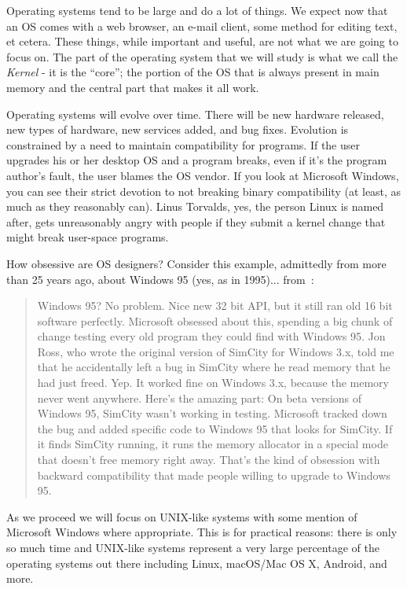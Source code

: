 Operating systems tend to be large and do a lot of things. We expect now that an OS comes with a web browser, an e-mail client, some method for editing text, et cetera. These things, while important and useful, are not what we are going to focus on. The part of the operating system that we will study is what we call the \textit{Kernel} - it is the ``core''; the portion of the OS that is always present in main memory and the central part that makes it all work.

Operating systems will evolve over time. There will be new hardware released, new types of hardware, new services added, and bug fixes. Evolution is constrained by a need to maintain compatibility for programs. If the user upgrades his or her desktop OS and a program breaks, even if it's the program author's fault, the user blames the OS vendor. If you look at Microsoft Windows, you can see their strict devotion to not breaking binary compatibility (at least, as much as they reasonably can). Linus Torvalds, yes, the person Linux is named after, gets unreasonably angry with people if they submit a kernel change that might break user-space programs. 

How obsessive are OS designers? Consider this example, admittedly from more than 25 years ago, about Windows 95 (yes, as in 1995)... from~\cite{joelce}:

\begin{quote}
Windows 95? No problem. Nice new 32 bit API, but it still ran old 16 bit software perfectly. Microsoft obsessed about this, spending a big chunk of change testing every old program they could find with Windows 95. Jon Ross, who wrote the original version of SimCity for Windows 3.x, told me that he accidentally left a bug in SimCity where he read memory that he had just freed. Yep. It worked fine on Windows 3.x, because the memory never went anywhere. Here's the amazing part: On beta versions of Windows 95, SimCity wasn't working in testing. Microsoft tracked down the bug and added specific code to Windows 95 that looks for SimCity. If it finds SimCity running, it runs the memory allocator in a special mode that doesn't free memory right away. That's the kind of obsession with backward compatibility that made people willing to upgrade to Windows 95.
\end{quote}

As we proceed we will focus on UNIX-like systems with some mention of Microsoft Windows where appropriate. This is for practical reasons: there is only so much time and UNIX-like systems represent a very large percentage of the operating systems out there including Linux, macOS/Mac OS X, Android, and more.

